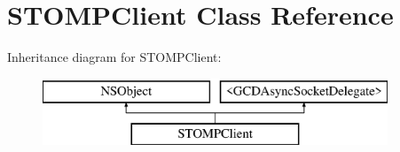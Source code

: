 \hypertarget{interface_s_t_o_m_p_client}{}\section{S\+T\+O\+M\+P\+Client Class Reference}
\label{interface_s_t_o_m_p_client}
Inheritance diagram for S\+T\+O\+M\+P\+Client\+:\begin{figure}[H]
\begin{center}
\leavevmode
\includegraphics[height=2.000000cm]{interface_s_t_o_m_p_client}
\end{center}
\end{figure}
